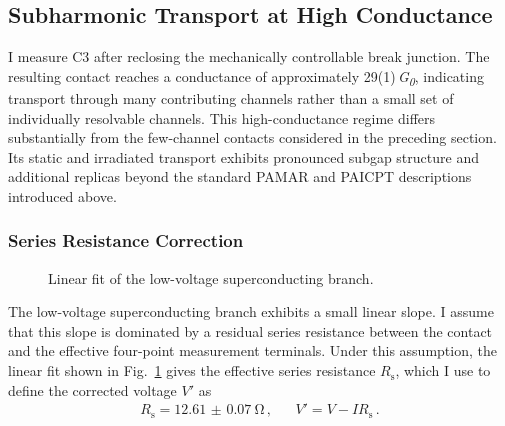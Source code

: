 \subsection{Subharmonic Transport at High Conductance}
\label{subsec:ac:subharmonic}

    I measure C3 after reclosing the mechanically controllable break junction. The resulting contact reaches a conductance of approximately 29(1)\,\textit{G\textsubscript{0}}, indicating transport through many contributing channels rather than a small set of individually resolvable channels. This high-conductance regime differs substantially from the few-channel contacts considered in the preceding section. Its static and irradiated transport exhibits pronounced subgap structure and additional replicas beyond the standard PAMAR and PAICPT descriptions introduced above.

    \subsubsection*{Series Resistance Correction}

        \begin{figure}
            \captionsetup{format=plain}%
            \centering
            \vspace{-1.5em}
            \vspace{-.5em}
            \caption{
                    Linear fit of the low-voltage superconducting branch.
                }
            \label{fig:ac:contact3:rs-fit}
        \end{figure}

        The low-voltage superconducting branch exhibits a small linear slope. I assume that this slope is dominated by a residual series resistance between the contact and the effective four-point measurement terminals. Under this assumption, the linear fit shown in Fig.~\ref{fig:ac:contact3:rs-fit} gives the effective series resistance \(R_\mathrm{s}\), which I use to define the corrected voltage $V'$ as
        \begin{align}
            R_\mathrm{s}=\qty{12.61(7)}{\ohm}\,, && V'=V-I R_\mathrm{s}\,.
            \label{eq:ac:contact3:voltage-correction}
        \end{align}

